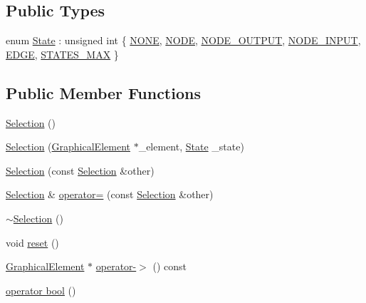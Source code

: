 \subsection*{Public Types}
\begin{DoxyCompactItemize}
\item 
enum \hyperlink{struct_selection_a908531395e550b540712fe90c8f6fe68}{State} \+: unsigned int \{ \newline
\hyperlink{struct_selection_a908531395e550b540712fe90c8f6fe68a67245bf00491dcf87035dc283aee8fdb}{N\+O\+NE}, 
\hyperlink{struct_selection_a908531395e550b540712fe90c8f6fe68a6fd16b9ae948aca852cf05b41412fcc6}{N\+O\+DE}, 
\hyperlink{struct_selection_a908531395e550b540712fe90c8f6fe68a22035ec22ebdf482f99716adff773973}{N\+O\+D\+E\+\_\+\+O\+U\+T\+P\+UT}, 
\hyperlink{struct_selection_a908531395e550b540712fe90c8f6fe68ad14d85b376ec221132c0641a7e184c04}{N\+O\+D\+E\+\_\+\+I\+N\+P\+UT}, 
\newline
\hyperlink{struct_selection_a908531395e550b540712fe90c8f6fe68a568db5d6d95ce590f2c1469ae848197d}{E\+D\+GE}, 
\hyperlink{struct_selection_a908531395e550b540712fe90c8f6fe68a7facd456725b2ae61a8804ea8e9f96e4}{S\+T\+A\+T\+E\+S\+\_\+\+M\+AX}
 \}
\end{DoxyCompactItemize}
\subsection*{Public Member Functions}
\begin{DoxyCompactItemize}
\item 
\hyperlink{struct_selection_a53d1bd270d6d257d34d5bc8d50028049}{Selection} ()
\item 
\hyperlink{struct_selection_a4f2f14073708ac849fae48b8beac678c}{Selection} (\hyperlink{class_graphical_element}{Graphical\+Element} $\ast$\+\_\+element, \hyperlink{struct_selection_a908531395e550b540712fe90c8f6fe68}{State} \+\_\+state)
\item 
\hyperlink{struct_selection_aa48cbe228a7a072f22a80e5c412c772b}{Selection} (const \hyperlink{struct_selection}{Selection} \&other)
\item 
\hyperlink{struct_selection}{Selection} \& \hyperlink{struct_selection_a83565714b5bc3062d9504ad235a42143}{operator=} (const \hyperlink{struct_selection}{Selection} \&other)
\item 
\hyperlink{struct_selection_a1860ec524d11c03de8c10a9354319839}{$\sim$\+Selection} ()
\item 
void \hyperlink{struct_selection_a15280d931dd5c83c2ab2554254f5248d}{reset} ()
\item 
\hyperlink{class_graphical_element}{Graphical\+Element} $\ast$ \hyperlink{struct_selection_a73967a05efebc0e6fe55dd04b0d07fe0}{operator-\/$>$} () const
\item 
\hyperlink{struct_selection_a9cb09f5188184533a125351105990a0a}{operator bool} ()
\end{DoxyCompactItemize}
